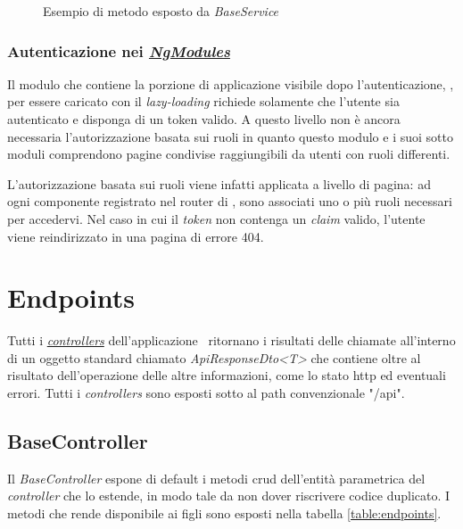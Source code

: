 \begin{figure}[H] 
	\centering    
	
	\caption[Esempio di metodo esposto da \textit{BaseService}]{Esempio di metodo esposto da \textit{BaseService}}
	\label{fig:client-auth-base-service}
\end{figure}

\subsubsection{Autenticazione nei \textit{\hyperref[client:modules]{NgModules}}}

Il modulo che contiene la porzione di applicazione visibile dopo l'autenticazione, \textit{}, per essere caricato con il \textit{lazy-loading} richiede solamente che l'utente sia autenticato e disponga di un token valido. A questo livello non è ancora necessaria l'autorizzazione basata sui ruoli in quanto questo modulo e i suoi sotto moduli comprendono pagine condivise raggiungibili da utenti con ruoli differenti.

L'autorizzazione basata sui ruoli viene infatti applicata a livello di pagina: ad ogni componente registrato nel router di \angular, sono associati uno o più ruoli necessari per accedervi. Nel caso in cui il \textit{token} non contenga un \textit{claim} valido, l'utente viene reindirizzato in una pagina di errore 404.

\section{Endpoints}

Tutti i \hyperref[server:controllers]{\textit{controllers}} dell'applicazione \expressjs~ritornano i risultati delle chiamate all'interno di un oggetto standard chiamato \textit{ApiResponseDto<T>} che contiene oltre al risultato dell'operazione delle altre informazioni, come lo stato \acrshort{http} ed eventuali errori. Tutti i \textit{controllers} sono esposti sotto al path convenzionale "/api".

\subsection{BaseController}
\label{server:base-controller}
Il \textit{BaseController} espone di default i metodi \acrshort{crud} dell'entità parametrica del \textit{controller} che lo estende, in modo tale da non dover riscrivere codice duplicato. I metodi che rende disponibile ai figli sono esposti nella tabella \ref{table:endpoints}.

